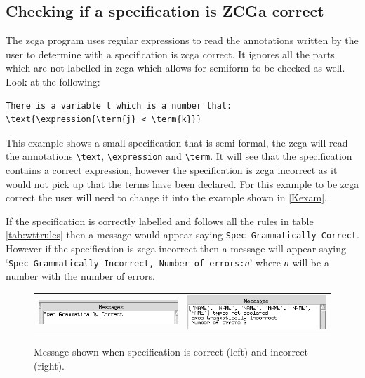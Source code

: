 \subsection{Checking if a specification is ZCGa correct}

The \gls{zcga} program uses regular expressions to read the annotations written
by the user to determine with a specification is \gls{zcga} correct. It ignores
all the parts which are not labelled in \gls{zcga} which allows for
\gls{semiform} to be checked as well. Look at the following:

\begin{exam}
\begin{verbatim}
There is a variable t which is a number that:
\text{\expression{\term{j} < \term{k}}}
\end{verbatim}
\end{exam}

This example shows a small specification that is semi-formal, the \gls{zcga}
will read the annotations \verb|\text|, \verb|\expression| and \verb|\term|. It
will see that the specification contains a correct expression, however the
specification is \gls{zcga} incorrect as it would not pick up that the terms
have been declared. For this example to be \gls{zcga} correct the user will need
to change it into the example shown in \ref{Kexam}.

If the specification is correctly labelled and follows all the rules in table
\ref{tab:wttrules} then a message would appear saying \texttt{Spec Grammatically
Correct}. However if the specification is \gls{zcga} incorrect then a message
will appear saying `\texttt{Spec Grammatically Incorrect, Number of
errors:\emph{n}}' where \texttt{\emph{n}} will be a number with the number of
errors.

\begin{figure}[H]
\begin{tabular}{c c}
\includegraphics[width=7cm]{Figures/zcga/zcgacorrect.png} 
& \includegraphics[width=7cm]{Figures/zcga/zcgaincorrect.png}
\end{tabular}
\caption{Message shown when specification is correct (left) and incorrect (right).\label{fig:correctandincorrect}}
\end{figure}

